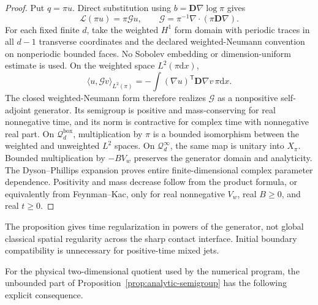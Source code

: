 \documentclass[aps,physrev,onecolumn,amsmath,amssymb,longbibliography]{revtex4-2}
\newcommand{\dd}{\mathrm d}
\newcommand{\Lfree}{\mathcal L}
\newcommand{\Qbox}{\mathcal Q_d^{\mathrm{box}}}
\newcommand{\Qinf}{\mathcal Q_d^{\infty}}
\begin{document}
\begin{proof}
Put \(q=\pi u\).  Direct substitution using
\(b=\bm D\nabla\log\pi\) gives
\begin{equation}
 \Lfree(\pi u)=\pi\mathcal Gu,
 \qquad
 \mathcal G=\pi^{-1}\nabla\!\cdot(\pi\bm D\nabla).
 \label{eq:similarity}
\end{equation}
For each fixed finite \(d\), take the weighted \(H^1\) form domain with
periodic traces in all \(d-1\) transverse coordinates and the declared
weighted-Neumann convention on nonperiodic bounded faces.  No Sobolev
embedding or dimension-uniform estimate is used.
On the weighted space \(L^2(\pi\dd x)\),
\begin{equation}
 \langle u,\mathcal Gv\rangle_{L^2(\pi)}
 =-\int(\nabla u)^{\mathsf T}\bm D\nabla v\,\pi\dd x.
 \label{eq:dirichlet-form}
\end{equation}
The closed weighted-Neumann form therefore realizes \(\mathcal G\) as a
nonpositive self-adjoint generator.  Its semigroup is positive and
mass-conserving for real nonnegative time, and its norm is contractive for
complex time with nonnegative real part.  On \(\Qbox\),
multiplication by \(\pi\) is a bounded isomorphism between the weighted and
unweighted \(L^2\) spaces.  On \(\Qinf\), the same map is unitary into
\(X_\pi\).  Bounded multiplication by \(-BV_w\) preserves the generator
domain and analyticity.  The Dyson--Phillips expansion proves entire
finite-dimensional complex parameter dependence.  Positivity and mass decrease
follow from the product formula, or equivalently from Feynman--Kac, only for
real nonnegative \(V_w\), real \(B\ge0\), and real \(t\ge0\).
\end{proof}

The proposition gives time regularization in powers of the generator, not
global classical spatial regularity across the sharp contact interface.
Initial boundary compatibility is unnecessary for positive-time mixed jets.

For the physical two-dimensional quotient used by the numerical program, the
unbounded part of Proposition~\ref{prop:analytic-semigroup} has the following
explicit consequence.
\end{document}
